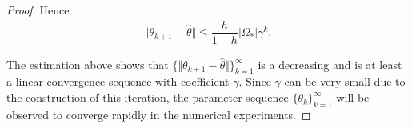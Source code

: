 \documentclass[a4paper, 11pt]{article}
\numberwithin{equation}{section}
\begin{document}
\begin{proof}
Hence 
\begin{align}
\Vert \theta_{k+1} - \hat{\theta} \Vert \leq \dfrac{h}{1-h} \vert \Omega_* \vert \gamma^k.
\end{align}

The estimation above shows that $\lbrace \Vert \theta_{k+1} - \hat{\theta} \Vert \rbrace_{k=1}^{\infty}$ is a decreasing and is at least a linear convergence sequence with coefficient $\gamma$. Since $\gamma$ can be very small due to the construction of this iteration, the parameter sequence $\lbrace \theta_k \rbrace_{k=1}^{\infty}$ will be observed to converge rapidly in the numerical experiments.

\end{proof}

\end{document}
